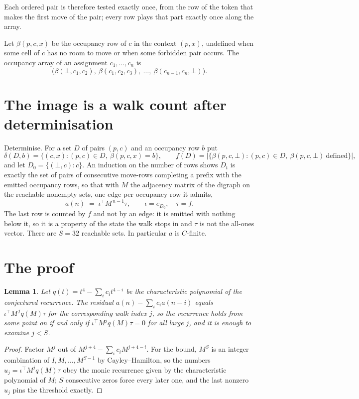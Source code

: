 \documentclass[11pt,a4paper]{article}
\theoremstyle{plain}
\newtheorem{lemma}[theorem]{Lemma}
\theoremstyle{definition}
\begin{document}
Each ordered pair is therefore tested exactly once, from the row of the token that makes the
first move of the pair; every row plays that part exactly once along the array.

Let $\beta(p,c,x)$ be the occupancy row of $c$ in the context $(p,x)$, undefined when some
cell of $c$ has no room to move or when some forbidden pair occurs. The occupancy array of an
assignment $c_1,\dots,c_n$ is
\[
\bigl(\beta(\bot,c_1,c_2),\ \beta(c_1,c_2,c_3),\ \dots,\ \beta(c_{n-1},c_n,\bot)\bigr).
\]

\section{The image is a walk count after determinisation}

Determinise. For a set $D$ of pairs $(p,c)$ and an occupancy row $b$ put
\[
\delta(D,b)=\{(c,x):(p,c)\in D,\ \beta(p,c,x)=b\},\qquad
f(D)=\bigl|\{\beta(p,c,\bot):(p,c)\in D,\ \beta(p,c,\bot)\ \text{defined}\}\bigr| ,
\]
and let $D_0=\{(\bot,c):c\}$. An induction on the number of rows shows $D_t$ is exactly the
set of pairs of consecutive move-rows completing a prefix with the emitted occupancy rows, so
that with $M$ the adjacency matrix of the digraph on the reachable nonempty sets, one edge per
occupancy row it admits,
\[
a(n)\;=\;\iota^{\!\top}M^{\,n-1}\tau,\qquad \iota=e_{D_0},\quad \tau=f .
\]
The last row is counted by $f$ and not by an edge: it is emitted with nothing below it, so it
is a property of the state the walk stops in and $\tau$ is not the all-ones vector. There are
$S=32$ reachable sets. In particular $a$ is $C$-finite.

\section{The proof}

\begin{lemma}\label{lem:crit}
Let $q(t)=t^{4}-\sum_i c_it^{4-i}$ be the characteristic polynomial of the
conjectured recurrence. The residual $a(n)-\sum_ic_ia(n-i)$ equals
$\iota^{\!\top}M^{\,j}q(M)\tau$ for the corresponding walk index $j$, so the recurrence
holds from some point on if and only if $\iota^{\!\top}M^{j}q(M)\tau=0$ for all large $j$,
and it is enough to examine $j<S$.
\end{lemma}

\begin{proof}
Factor $M^{j}$ out of $M^{j+4}-\sum_ic_iM^{j+4-i}$. For the bound, $M^{S}$
is an integer combination of $I,M,\dots,M^{S-1}$ by Cayley--Hamilton, so the numbers
$u_j=\iota^{\!\top}M^{j}q(M)\tau$ obey the monic recurrence given by the characteristic
polynomial of $M$; $S$ consecutive zeros force every later one, and the last nonzero $u_j$
pins the threshold exactly.
\end{proof}
\end{document}
